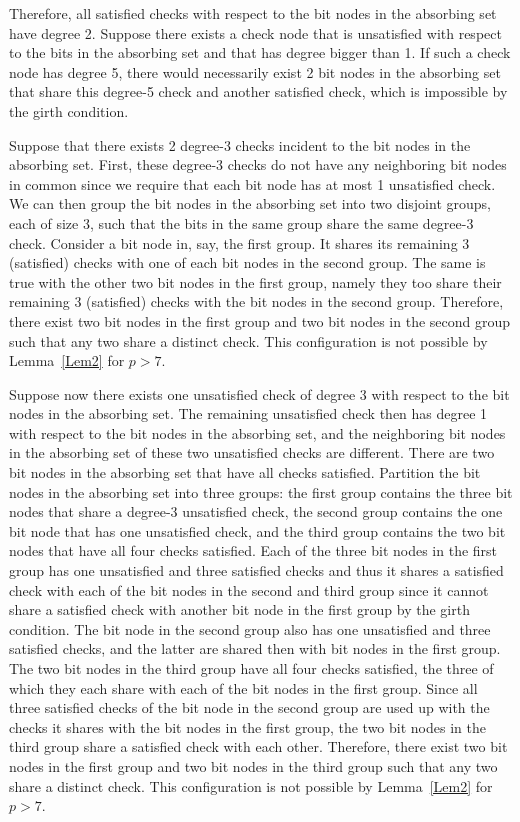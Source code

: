 Therefore, all satisfied checks with respect to the bit nodes in the
absorbing set have degree 2. Suppose there exists a check node that
is unsatisfied with respect to the bits in the absorbing set and
that has degree bigger than 1. If such a check node has degree 5,
there would necessarily exist 2 bit nodes in the absorbing set that
share this degree-5 check and another satisfied check, which is
impossible by the girth condition.

Suppose that there exists 2 degree-3 checks incident to the bit
nodes in the absorbing set. First, these degree-3 checks do not have
any neighboring bit nodes in common since we require that each bit
node has at most 1 unsatisfied check. We can then group the bit
nodes in the absorbing set into two disjoint groups, each of size 3,
such that the bits in the same group share the same degree-3 check.
Consider a bit node in, say, the first group. It shares its
remaining 3 (satisfied) checks with one of each bit nodes in the
second group. The same is true with the other two bit nodes in the
first group, namely they too share their remaining 3 (satisfied)
checks with the bit nodes in the second group. Therefore, there
exist two bit nodes in the first group and two bit nodes in the
second group such that any two share a distinct check. This
configuration is not possible by Lemma~\ref{Lem2} for $p>7$.

Suppose now there exists one unsatisfied check of degree 3 with
respect to the bit nodes in the absorbing set. The remaining
unsatisfied check then has degree 1 with respect to the bit nodes in
the absorbing set, and the neighboring bit nodes in the absorbing
set of these two unsatisfied checks are different. There are two bit
nodes in the absorbing set that have all checks satisfied. Partition
the bit nodes in the absorbing set into three groups: the first
group contains the three  bit nodes that share a degree-3
unsatisfied check, the second group contains the one bit node that
has one unsatisfied check, and the third group contains the two bit
nodes that have all four checks satisfied. Each of the three bit
nodes in the first group has one unsatisfied and three satisfied
checks and thus it shares a satisfied check with each of the bit
nodes in the second and third group since it cannot share a
satisfied check with another bit node in the first group by the
girth condition. The bit node in the second group also has one
unsatisfied and three satisfied checks, and the latter are shared
then with bit nodes in the first group. The two bit nodes in the
third group have all four checks satisfied, the three of which they
each share with each of the bit nodes in the first group. Since all
three satisfied checks of the bit node in the second group are used
up with the checks it shares with the bit nodes in the first group,
the two bit nodes in the third group share a satisfied check with
each other. Therefore, there exist two bit nodes in the first group
and two bit nodes in the third group such that any two share a
distinct check. This configuration is not possible by
Lemma~\ref{Lem2} for $p>7$.

